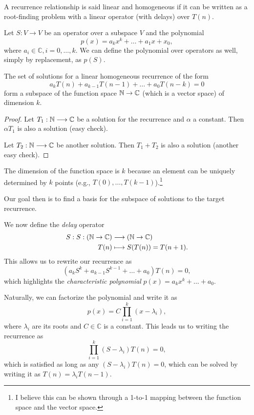 
\begin{previouslyseen}
    A recurrence relationship is said linear and homogeneous if it can be written as a root-finding problem with a linear operator (with delays) over $T(n)$.
\end{previouslyseen}

Let $S: V \longrightarrow V$ be an operator over a subspace $V$ and the polynomial \[
p(x) = a_k x^{k} + \ldots + a_1 x + x_0
,\] where $a_i\in \mathbb{C}, i=0,\ldots,k$.
We can define the polynomial over operators as well, simply by replacement, as $p(S)$.

\begin{lemma}
    The set of solutions for a linear homogeneous recurrence of the form \[
	a_k T(n) + a_{k-1} T(n-1) +\ldots + a_0 T(n-k) = 0
    \] form a subspace of the function space $\mathbb{N}\to \mathbb{C}$ (which is a vector space) of dimension $k$.
\end{lemma}
\begin{proof}
    Let $T_1 : \mathbb{N} \longrightarrow \mathbb{C}$ be a solution for the recurrence and $\alpha$ a constant.
    Then $\alpha T_1$ is also a solution (easy check).

    Let $T_2: \mathbb{N} \longrightarrow \mathbb{C}$ be another solution.
    Then $T_1+T_2$ is also a solution (another easy check).
\end{proof}

\begin{note}
    The dimension of the function space is $k$ because an element can be uniquely determined by $k$ points (e.g., $T(0),\ldots,T(k-1)$).\footnote{I believe this can be shown through a 1-to-1 mapping between the function space and the vector space.}
\end{note}

Our goal then is to find a basis for the subspace of solutions to the target recurrence.

We now define the \emph{delay} operator 
\begin{align*}
    S: S: (\mathbb{N}\to \mathbb{C}) &\longrightarrow (\mathbb{N}\to \mathbb{C}) \\
    T(n) &\longmapsto S(T(n)) = T(n+1)
.\end{align*}
This allows us to rewrite our recurrence as \[
    (a_k S^{k} + a_{k-1}S^{k-1} + \ldots + a_0)T(n) = 0
,\] which highlights the \emph{characteristic polynomial} $p(x) = a_kx^{k}+\ldots+a_0$.

Naturally, we can factorize the polynomial and write it as \[
    p(x) = C \prod_{i=1}^{k} (x-\lambda_i) 
,\] where $\lambda_i$ are its roots and $C\in \mathbb{C}$ is a constant.
This leads us to writing the recurrence as \[
    \prod_{i=1}^{k} (S-\lambda_i) T(n) = 0
,\] which is satisfied as long as any $(S-\lambda_i)T(n) = 0$, which can be solved by writing it as $T(n) = \lambda_i T(n-1)$.


